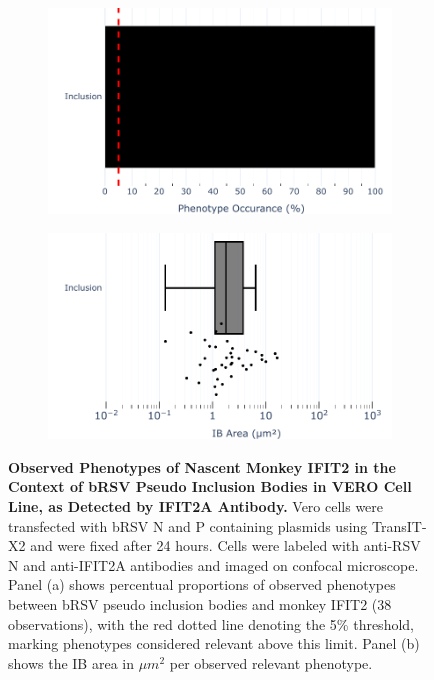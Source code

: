 \begin{figure}
    \begin{subfigure}{0.495\textwidth}
        \caption{}
        \includegraphics[width=1\linewidth]{09. Chapter 4/Figs/02. pIB/02. IFIT2A/07. bar_i2a_vero_bnbp.pdf} 
    \end{subfigure}
    \begin{subfigure}{0.495\textwidth}
        \caption{}
        \includegraphics[width=1\linewidth]{09. Chapter 4/Figs/02. pIB/02. IFIT2A/08. box_i2a_vero_bnbp.pdf}
    \end{subfigure}
    \caption[Observed Phenotypes of Nascent Monkey IFIT2 in the Context of bRSV Pseudo Inclusion Bodies in VERO Cell Line, as Detected by IFIT2A Antibody.]{\textbf{Observed Phenotypes of Nascent Monkey IFIT2 in the Context of bRSV Pseudo Inclusion Bodies in VERO Cell Line, as Detected by IFIT2A Antibody.} Vero cells were transfected with bRSV N and P containing plasmids using TransIT-X2 and were fixed after 24 hours. Cells were labeled with anti-RSV N and anti-IFIT2A antibodies and imaged on confocal microscope. Panel (a) shows percentual proportions of observed phenotypes between bRSV pseudo inclusion bodies and monkey IFIT2 (38 observations), with the red dotted line denoting the 5\% threshold, marking phenotypes considered relevant above this limit. Panel (b) shows the IB area in \(\mu m^2\) per observed relevant phenotype.}
    \label{fig:Observed Phenotypes of Nascent Monkey IFIT2 in the Context of bRSV Pseudo Inclusion Bodies in VERO Cell Line, as Detected by IFIT2A Antibody}
\end{figure}

